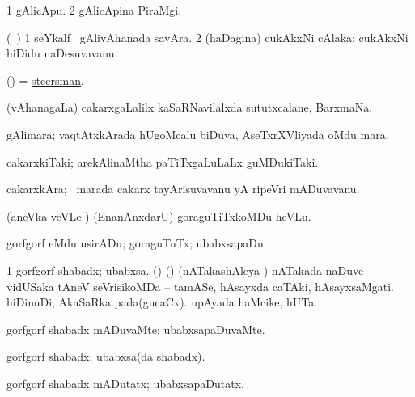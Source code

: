 \bentry
{} 
\gl{\nA}
\expl{}
\bmng
\bnum
\num{1} gAlicApu. 
\num{2} gAlicApina PiraMgi. 
\enum
\emng
\eentry

\bentry
{} 
\gl{\nA}
\expl{}
\bmng
(\kanmu\ \ame) 
\bnum
\num{1} seYkalf \mo\ gAlivAhanada savAra. 
\num{2} (haDagina) cukAkxNi cAlaka; cukAkxNi hiDidu naDesuvavanu. 
\enum
\emng
\eentry

\bentry
{} 
\gl{\nA}
\bmng
(\ame) = \hyperref{kandict_s.pdf}{S}{steersman}{steersman}. 
\emng
\eentry

\bentry
{} 
\gl{\nA}
\expl{}
\bmng
(vAhanagaLa) cakarxgaLalilx kaSaRNavilalxda sututxcalane, BarxmaNa. 
\emng
\eentry

\bentry
{} 
\gl{\nA}
\expl{}
\bmng
gAlimara; vaqtAtxkArada hUgoMcalu biDuva, AseTxrXVliyada oMdu mara. 
\emng
\eentry

\bentry
{} 
\gl{\nA}
\expl{}
\bmng
cakarxkiTaki; arekAlinaMtha paTiTxgaLuLaLx guMDukiTaki. 
\emng
\eentry

\bentry
{} 
\gl{\nA}
\expl{}
\bmng
cakarxkAra; \kanmu\ marada cakarx tayArisuvavanu yA ripeVri mADuvavanu. 
\emng
\eentry

\bentry
{} 
\gl{\sakirx}
\expl{}
\bmng
(aneVka veVLe ) (EnanAnxdarU) goraguTiTxkoMDu heVLu. 
\emng

\noindent 
\gl{\akirx}
\expl{}
\bmng
gorfgorf eMdu usirADu; goraguTuTx; ubabxsapaDu. 
\emng
\eentry

\bentry
{} 
\gl{\nA}
\expl{}
\bmng
\bnum
\num{1} gorfgorf shabadx; ubabxsa. 
 (\AmA) 
\banum
{} (\birx) (nATakashAleya \ashi) nATakada naDuve vidUSaka tAneV seVrisikoMDa -- tamASe, hAsayxda caTAki, hAsayxsaMgati. 
 hiDinuDi; AkaSaRka pada(gucaCx). 
 upAyada haMcike, hUTa. 
\eanum
\numie
\enum
\emng
\eentry

\bentry
{} 
\gl{\kirxvi}
\expl{}
\bmng
gorfgorf shabadx mADuvaMte; ubabxsapaDuvaMte. 
\emng
\eentry

\bentry
{} 
\gl{\nA}
\expl{}
\bmng
gorfgorf shabadx; ubabxsa(da shabadx). 
\emng
\eentry

\bentry
{} 
\gl{\kirxvi}
\expl{}
\bmng
gorfgorf shabadx mADutatx; ubabxsapaDutatx. 
\emng
\eentry


